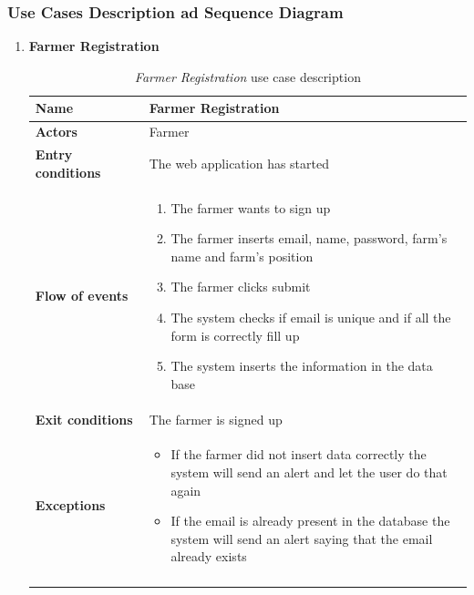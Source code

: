 \subsubsection{Use Cases Description ad Sequence Diagram}
\begin{enumerate}
    \item \textbf{Farmer Registration} 
        \begin{longtable}{p{0.26\linewidth}p{0.75\linewidth}}
            \toprule
            \textbf{Name} & \textbf{Farmer Registration} \\
            \midrule
            \textbf{Actors} & Farmer \\
            \midrule
            \textbf{Entry conditions} & The web application has started\\
            \midrule
            \textbf{Flow of events} & 
            \begin{enumerate}
                \item The farmer wants to sign up
                \item The farmer inserts email, name, password, farm's name and farm's position 
                \item The farmer clicks submit
                \item The system checks if email is unique and if all the form is correctly fill up 
                \item The system inserts the information in the data base
            \end{enumerate} \\
            \midrule
            \textbf{Exit conditions} & The farmer is signed up\\
            \midrule
            \textbf{Exceptions} & 
            \begin{itemize}
                \item If the farmer did not insert data correctly the system will send an alert and let the user do that again
                \item If the email is already present in the database the system will send an alert saying that the email already exists
            \end{itemize} \\
            \bottomrule
            \caption{\emph{Farmer Registration} use case description}
        \end{longtable}
        

\end{enumerate}

